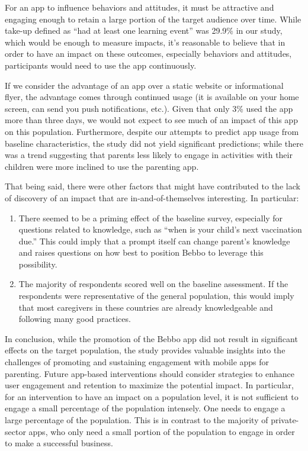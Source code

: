 For an app to influence behaviors and attitudes, it must be attractive and engaging enough to retain a large portion of the target audience over time. While take-up defined as “had at least one learning event” was 29.9\% in our study, which would be enough to measure impacts, it’s reasonable to believe that in order to have an impact on these outcomes, especially behaviors and attitudes, participants would need to use the app continuously.

If we consider the advantage of an app over a static website or informational flyer, the advantage comes through continued usage (it is available on your home screen, can send you push notifications, etc.). Given that only 3\% used the app more than three days, we would not expect to see much of an impact of this app on this population. Furthermore, despite our attempts to predict app usage from baseline characteristics, the study did not yield significant predictions; while there was a trend suggesting that parents less likely to engage in activities with their children were more inclined to use the parenting app.

That being said, there were other factors that might have contributed to the lack of discovery of an impact that are in-and-of-themselves interesting. In particular:

\begin{enumerate}
\item There seemed to be a priming effect of the baseline survey, especially for questions related to knowledge, such as “when is your child’s next vaccination due.” This could imply that a prompt itself can change parent’s knowledge and raises questions on how best to position Bebbo to leverage this possibility.
\item The majority of respondents scored well on the baseline assessment. If the respondents were representative of the general population, this would imply that most caregivers in these countries are already knowledgeable and following many good practices.
\end{enumerate}

In conclusion, while the promotion of the Bebbo app did not result in significant effects on the target population, the study provides valuable insights into the challenges of promoting and sustaining engagement with mobile apps for parenting. Future app-based interventions should consider strategies to enhance user engagement and retention to maximize the potential impact. In particular, for an intervention to have an impact on a population level, it is not sufficient to engage a small percentage of the population intensely. One needs to engage a large percentage of the population. This is in contrast to the majority of private-sector apps, who only need a small portion of the population to engage in order to make a successful business.

